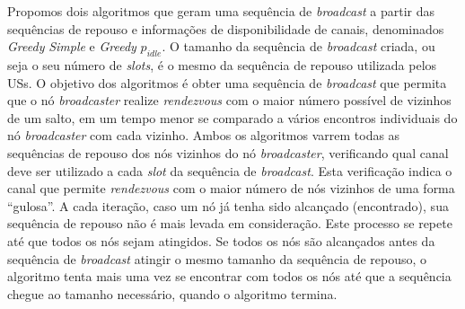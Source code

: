 
Propomos dois algoritmos que geram uma sequência de {\it broadcast} a partir das sequências de repouso e informações de disponibilidade de canais, denominados {\it Greedy} {\it Simple} e {\it Greedy} $p_{idle}$. O tamanho da sequência de {\it broadcast} criada, ou seja o seu número de {\it slots}, é o mesmo da sequência de repouso utilizada pelos USs. O objetivo dos algoritmos é obter uma sequência de {\it broadcast} que permita que o nó {\it broadcaster} realize {\it rendezvous} com o maior número possível de vizinhos de um salto, em um tempo menor se comparado a vários encontros individuais do nó {\it broadcaster} com cada vizinho. Ambos os algoritmos varrem todas as sequências de repouso dos nós vizinhos do nó {\it broadcaster}, verificando qual canal deve ser utilizado a cada {\it slot} da sequência de {\it broadcast}. Esta verificação indica o canal que permite {\it rendezvous} com o maior número de nós vizinhos de uma forma ``gulosa''. A cada iteração, caso um nó já tenha sido alcançado (encontrado), sua sequência de repouso não é mais levada em consideração. Este processo se repete até que todos os nós sejam atingidos. Se todos os nós são alcançados antes da sequência de {\it broadcast} atingir o mesmo tamanho da sequência de repouso, o algoritmo tenta mais uma vez se encontrar com todos os nós até que a sequência chegue ao tamanho necessário, quando o algoritmo termina.



